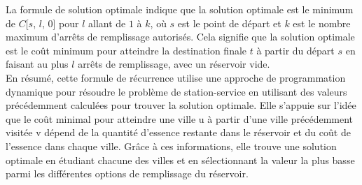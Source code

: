 \documentclass[a4paper,11pt]{article}
\begin{document}
{La formule de solution optimale indique que la solution optimale est le minimum de $C$[$s$, $l$, $0$] pour $l$ allant de $1$ à $k$, où $s$ est le point de départ et $k$ est le nombre maximum d'arrêts de remplissage autorisés. Cela signifie que la solution optimale est le coût minimum pour atteindre la destination finale $t$ à partir du départ $s$ en faisant au plus $l$ arrêts de remplissage, avec un réservoir vide.\\En résumé, cette formule de récurrence utilise une approche de programmation dynamique pour résoudre le problème de station-service en utilisant des valeurs précédemment calculées pour trouver la solution optimale. Elle s'appuie sur l'idée que le coût minimal pour atteindre une ville u à partir d'une ville précédemment visitée v dépend de la quantité d'essence restante dans le réservoir et du coût de l'essence dans chaque ville. Grâce à ces informations, elle trouve une solution optimale en étudiant chacune des villes et en sélectionnant la valeur la plus basse parmi les différentes options de remplissage du réservoir.   
\\\\}
\end{document}
